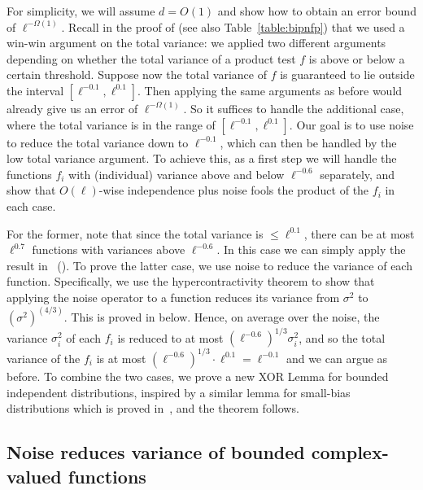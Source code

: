 \documentclass{toc}
\def\Blocklength{\ell}
\begin{document}
  For simplicity, we will assume $d = O(1)$ and show how to obtain an error bound of $\Blocklength^{-\Omega(1)}$.
  Recall in the proof of  (see also Table~\ref{table:bipnfp}) that we used a win-win argument on the total variance: we applied two different arguments depending on whether the total variance of a product test $f$ is above or below a certain threshold.
  Suppose now the total variance of $f$ is guaranteed to lie outside the interval $[\Blocklength^{-0.1}, \Blocklength^{0.1}]$.
  Then applying the same arguments as before would already give us an error of $\Blocklength^{-\Omega(1)}$.
  So it suffices to handle the additional case, where the total variance is in the range of $[\Blocklength^{-0.1}, \Blocklength^{0.1}]$.
	Our goal is to use noise to reduce the total variance down to $\Blocklength^{-0.1}$, which can then be handled by the low total variance argument.
  To achieve this, as a first step we will handle the functions $f_i$ with (individual) variance above and below $\Blocklength^{-0.6}$ separately, and show that $O(\Blocklength)$-wise independence plus noise fools the product of the $f_i$ in each case.

  For the former, note that since the total variance is $\le \Blocklength^{0.1}$, there can be at most $\Blocklength^{0.7}$ functions with variances above $\Blocklength^{-0.6}$.
  In this case we can simply apply the result in~\cite{HaramatyLV-bipnfp} ().
  To prove the latter case, we use noise to reduce the variance of each function.
  Specifically, we use the hypercontractivity theorem to show that applying the noise operator to a function reduces its variance from $\sigma^2$ to $(\sigma^2)^{(4/3)}$.
  This is proved in  below.
	Hence, on average over the noise, the variance $\sigma_i^2$ of each $f_i$ is reduced to at most $(\Blocklength^{-0.6})^{1/3} \sigma_i^2$, and so the total variance of the $f_i$ is at most $(\Blocklength^{-0.6})^{1/3} \cdot \Blocklength^{0.1} = \Blocklength^{-0.1}$ and we can argue as before.
  To combine the two cases, we prove a new XOR Lemma for bounded independent distributions, inspired by a similar lemma for small-bias distributions which is proved in~\cite{GopalanMRTV12}, and the theorem follows.

  \subsection{Noise reduces variance of bounded complex-valued functions} \label{sec:noise-reduce-var}
\end{document}
